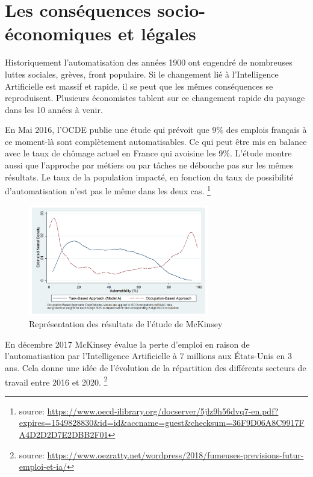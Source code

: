 \chapter{Les conséquences socio-économiques et légales}

    Historiquement l'automatisation des années 1900 ont engendré de nombreuses luttes sociales, grèves, front populaire.
    Si le changement lié à l'Intelligence Artificielle est massif et rapide, il se peut que les mêmes conséquences se reproduisent.
    Plusieurs économistes tablent sur ce changement rapide du paysage dans les 10 années à venir. \newline

    En Mai 2016, l'OCDE publie une étude qui prévoit que 9\% des emplois français à ce moment-là sont complètement automatisables.
    Ce qui peut être mis en balance avec le taux de chômage actuel en France qui avoisine les 9\%.
    L'étude montre aussi que l'approche par métiers ou par tâches ne débouche pas sur les mêmes résultats. Le taux de la population impacté,
    en fonction du taux de possibilité d'automatisation n'est pas le même dans les deux cas.
    \footnote{source: \url{https://www.oecd-ilibrary.org/docserver/5jlz9h56dvq7-en.pdf?expires=1549828830&id=id&accname=guest&checksum=36F9D06A8C9917FA4D2D2D7E2DBB2F01}}
    \newline

    \begin{figure}[H]
        \centering
        \includegraphics[width=0.7\textwidth]{Images/approcheparpostevsapprochepartache}
        \caption{Représentation des résultats de l'étude de McKinsey}
        \label{fig:explicability}
    \end{figure}

    En décembre 2017 McKinsey évalue la perte d'emploi en raison de l'automatisation par l'Intelligence Artificielle à 7 millions aux États-Unis
    en 3 ans. Cela donne une idée de l'évolution de la répartition des différents secteurs de travail entre 2016 et 2020.
    \footnote{source: \url{https://www.oezratty.net/wordpress/2018/fumeuses-previsions-futur-emploi-et-ia/}} \newline

